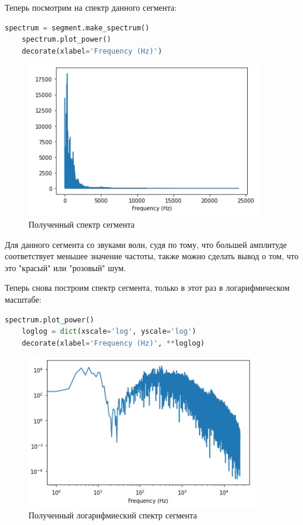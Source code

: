 \documentclass[a4paper]{article}
\begin{document}
            Теперь посмотрим на спектр данного сегмента:
            
\begin{lstlisting}[language=Python, caption= Получение спектра сегмента]
    spectrum = segment.make_spectrum()
    spectrum.plot_power()
    decorate(xlabel='Frequency (Hz)')
\end{lstlisting}               
            
            \begin{figure}[H]
                \centering
                \includegraphics{ex_1_wave_spectr.png}
                \caption{Полученный спектр сегмента}
                \label{fig:ex_1_wave_spectr}
            \end{figure}
            
            Для данного сегмента со звуками волн, судя по тому, что большей амплитуде соответствует меньшее значение  частоты, также можно сделать вывод о том, что это "красый" или "розовый" шум.
            
            Теперь снова построим спектр сегмента, только в этот раз в логарифмическом масштабе:
            
\begin{lstlisting}[language=Python, caption= Получение логарифмиеского спектра сегмента]
    spectrum.plot_power()
    loglog = dict(xscale='log', yscale='log')
    decorate(xlabel='Frequency (Hz)', **loglog)
\end{lstlisting}               
            
            \begin{figure}[H]
                \centering
                \includegraphics{ex_1_wave_log_spectr.png}
                \caption{Полученный логарифмиеский спектр сегмента}
                \label{fig:ex_1_wave_log_spectr}
            \end{figure}
            
\end{document}
